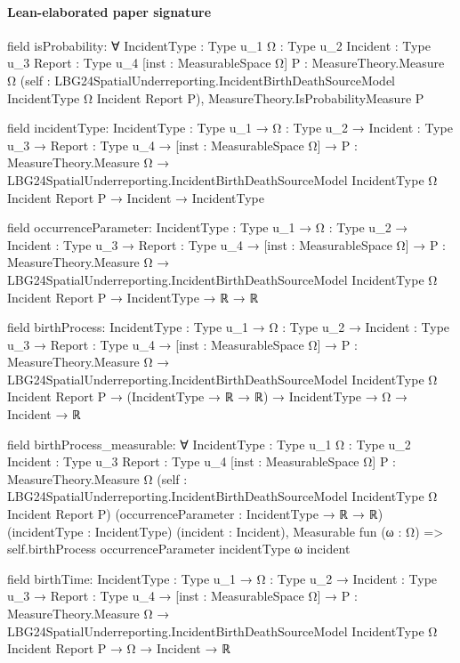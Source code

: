 \documentclass[10pt]{article}
\begin{document}
\paragraph{Lean-elaborated paper signature}
\begin{ReviewVerbatim}
field isProbability:
∀ {IncidentType : Type u_1} {Ω : Type u_2} {Incident : Type u_3} {Report : Type u_4} [inst : MeasurableSpace Ω]
  {P : MeasureTheory.Measure Ω}
  (self : LBG24SpatialUnderreporting.IncidentBirthDeathSourceModel IncidentType Ω Incident Report P),
  MeasureTheory.IsProbabilityMeasure P

field incidentType:
{IncidentType : Type u_1} →
  {Ω : Type u_2} →
    {Incident : Type u_3} →
      {Report : Type u_4} →
        [inst : MeasurableSpace Ω] →
          {P : MeasureTheory.Measure Ω} →
            LBG24SpatialUnderreporting.IncidentBirthDeathSourceModel IncidentType Ω Incident Report P →
              Incident → IncidentType

field occurrenceParameter:
{IncidentType : Type u_1} →
  {Ω : Type u_2} →
    {Incident : Type u_3} →
      {Report : Type u_4} →
        [inst : MeasurableSpace Ω] →
          {P : MeasureTheory.Measure Ω} →
            LBG24SpatialUnderreporting.IncidentBirthDeathSourceModel IncidentType Ω Incident Report P →
              IncidentType → ℝ → ℝ

field birthProcess:
{IncidentType : Type u_1} →
  {Ω : Type u_2} →
    {Incident : Type u_3} →
      {Report : Type u_4} →
        [inst : MeasurableSpace Ω] →
          {P : MeasureTheory.Measure Ω} →
            LBG24SpatialUnderreporting.IncidentBirthDeathSourceModel IncidentType Ω Incident Report P →
              (IncidentType → ℝ → ℝ) → IncidentType → Ω → Incident → ℝ

field birthProcess_measurable:
∀ {IncidentType : Type u_1} {Ω : Type u_2} {Incident : Type u_3} {Report : Type u_4} [inst : MeasurableSpace Ω]
  {P : MeasureTheory.Measure Ω}
  (self : LBG24SpatialUnderreporting.IncidentBirthDeathSourceModel IncidentType Ω Incident Report P)
  (occurrenceParameter : IncidentType → ℝ → ℝ) (incidentType : IncidentType) (incident : Incident),
  Measurable fun (ω : Ω) => self.birthProcess occurrenceParameter incidentType ω incident

field birthTime:
{IncidentType : Type u_1} →
  {Ω : Type u_2} →
    {Incident : Type u_3} →
      {Report : Type u_4} →
        [inst : MeasurableSpace Ω] →
          {P : MeasureTheory.Measure Ω} →
            LBG24SpatialUnderreporting.IncidentBirthDeathSourceModel IncidentType Ω Incident Report P → Ω → Incident → ℝ


\end{ReviewVerbatim}
\end{document}
